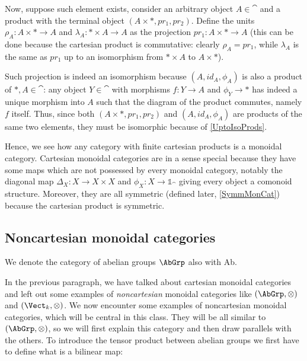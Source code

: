 \noindent Now, suppose such element exists, consider an arbitrary object $A\in\cat$ and a product with the terminal object $(A\times\ast,pr_1,pr_2)$. Define the units $\rho_A:A\times\ast\to A$ and $\lambda_A:\ast\times A\to A$ as the projection $pr_1:A\times\ast\to A$ 
(this can be done because the cartesian product is commutative: clearly $\rho_A=pr_1$, while
 $\lambda_A$ is
 the same as $pr_1$
up to an isomorphism from  $\ast\times A$ to $A\times\ast$). 

\noindent Such projection is indeed an isomorphism because $(A,id_A,\phi_A)$ is also a product of $\ast,A\in\cat$: any object $Y\in\cat$ with morphisms $f:Y\to A$ and $\phi_Y\to\ast$ has indeed a unique morphism into $A$ such that the diagram of the product commutes, namely $f$ itself. 
Thus, since both $(A\times\ast,pr_1,pr_2)$ and $(A,id_A,\phi_A)$ are products of the same two elements, they must be isomorphic because of \ref{UptoIsoProds}.

\noindent Hence, we see how any category with finite cartesian products is a monoidal category.
 Cartesian monoidal categories are in a sense special because they have some maps which are not possessed by every monoidal category, notably the diagonal map $\Delta_X:X\to X\times X$ and $\phi_X:X\to\mathbb{1}_\cat$ giving every object a comonoid structure. Moreover, they are all symmetric (defined later, \ref{SymmMonCat}) because the cartesian product is symmetric. 

\subsection{Noncartesian monoidal categories \extra} %
\label{sub:noncartesian_monoidal_categories}

\begin{notat}
    We denote the category of abelian groups $\AbGrp$ also with Ab.
\end{notat}
\noindent In the previous paragraph, we have talked about cartesian monoidal categories and left out some examples of \emph{noncartesian} monoidal categories like $(\AbGrp,\otimes)$ and $(\Vect_k,\otimes)$. We now encounter some examples of noncartesian monoidal categories, which will be central in this class. They will be all similar to $(\AbGrp,\otimes)$, so we will first explain this category and then draw parallels with the others. To introduce the tensor product between abelian groups we first have to define what is a bilinear map:

